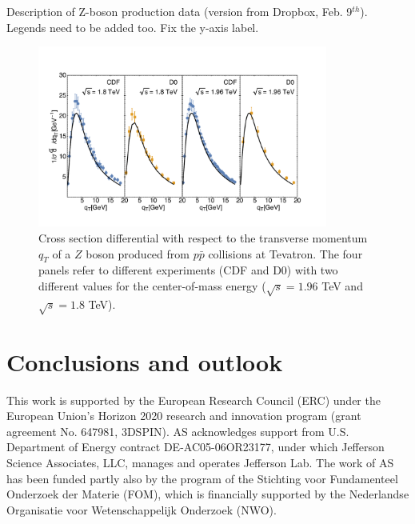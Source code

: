 \documentclass[aps,preprintnumbers,showpacs,nofootinbib,superscriptaddress,floatfix]{revtex4}
\begin{document}
Description of Z-boson production data (version from Dropbox, Feb. 9$^{th}$).
Legends need to be added too. Fix the y-axis label.
\begin{figure}[h!]
\begin{center}
\includegraphics[width=0.85\textwidth]{plots/DY-Z/Z_SCIplot_flINDEP.pdf}
\end{center}
\caption{Cross section differential with respect to the transverse momentum $q_T$ of a $Z$ boson produced from $p\bar{p}$ collisions at Tevatron. The four panels refer to different experiments (CDF and D$0$) with two different values for the center-of-mass energy ($\sqrt{s} = 1.96$ TeV and $\sqrt{s}=1.8$ TeV).} 
\label{f:Z_qT}
\end{figure}











\section{Conclusions and outlook}
\label{s:end}



\newpage
\begin{acknowledgments}
This work is supported by the European Research Council (ERC) under the European Union's Horizon 2020 research and innovation program (grant agreement No. 647981, 3DSPIN). 
AS acknowledges support from U.S. Department of Energy contract DE-AC05-06OR23177, under which Jefferson Science Associates, LLC, manages and operates Jefferson Lab. 
The work of AS has been funded partly also by the program of the Stichting voor Fundamenteel Onderzoek der Materie (FOM), which is financially supported by the Nederlandse Organisatie voor Wetenschappelijk Onderzoek (NWO).
\end{acknowledgments}
%
%

%

%
%
\end{document}
